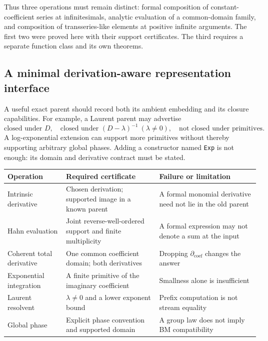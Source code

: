 \documentclass[11pt]{article}
\numberwithin{equation}{section}
\theoremstyle{definition}
\newcommand{\Dc}{\partial_{\mathrm{coef}}}
\begin{document}
Thus three operations must remain distinct: formal composition of
constant-coefficient series at infinitesimals, analytic evaluation of a
common-domain family, and composition of transseries-like elements at
positive infinite arguments. The first two were proved here with their
support certificates. The third requires a separate function class and
its own theorems.

\subsection{A minimal derivation-aware representation interface}
A useful exact parent should record both its ambient embedding and its
closure capabilities. For example, a Laurent parent may advertise
\[
 \text{closed under }D,\quad
 \text{closed under }(D-\lambda)^{-1}\ (\lambda\ne0),\quad
 \text{not closed under primitives}.
\]
A log-exponential extension can support more primitives without thereby
supporting arbitrary global phases. Adding a constructor named
\texttt{Exp} is not enough: its domain and derivative contract must be
stated.

\begin{center}
\begin{tabular}{@{}>{\raggedright\arraybackslash}p{}>{\raggedright\arraybackslash}p{}>{\raggedright\arraybackslash}p{}@{}}
\toprule
Operation & Required certificate & Failure or limitation \\
\midrule
Intrinsic derivative & Chosen derivation; supported image in a known parent & A formal monomial derivative need not lie in the old parent \\
Hahn evaluation & Joint reverse-well-ordered support and finite multiplicity & A formal expression may not denote a sum at the input \\
Coherent total derivative & One common coefficient domain; both derivatives & Dropping $\Dc$ changes the answer \\
Exponential integration & A finite primitive of the imaginary coefficient & Smallness alone is insufficient \\
Laurent resolvent & $\lambda\ne0$ and a lower exponent bound & Prefix computation is not stream equality \\
Global phase & Explicit phase convention and supported domain & A group law does not imply BM compatibility \\
\bottomrule
\end{tabular}
\end{center}
\end{document}
